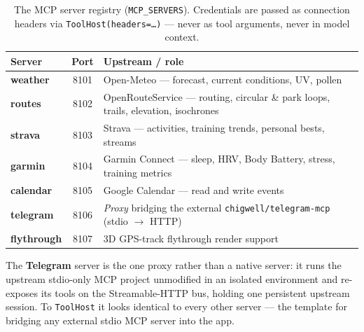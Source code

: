 \documentclass[11pt,a4paper]{article}
\newcommand{\code}[1]{{\small\texttt{#1}}}
\begin{document}
\begin{table}[ht]\centering\footnotesize
\renewcommand{\arraystretch}{1.25}
\begin{tabular}{@{}>{\bfseries}l c l@{}}
\toprule
\normalfont\textbf{Server} & \textbf{Port} & \textbf{Upstream / role} \\
\midrule
weather    & 8101 & Open-Meteo --- forecast, current conditions, UV, pollen \\
routes     & 8102 & OpenRouteService --- routing, circular \& park loops, trails, elevation, isochrones \\
strava     & 8103 & Strava --- activities, training trends, personal bests, streams \\
garmin     & 8104 & Garmin Connect --- sleep, HRV, Body Battery, stress, training metrics \\
calendar   & 8105 & Google Calendar --- read and write events \\
telegram   & 8106 & \emph{Proxy} bridging the external \code{chigwell/telegram-mcp} (stdio $\rightarrow$ HTTP) \\
flythrough & 8107 & 3D GPS-track flythrough render support \\
\bottomrule
\end{tabular}
\caption{The MCP server registry (\code{MCP\_SERVERS}). Credentials are passed as connection
headers via \code{ToolHost(headers=\ldots)} --- never as tool arguments, never in model context.}
\end{table}

The \textbf{Telegram} server is the one proxy rather than a native server: it runs the
upstream stdio-only MCP project unmodified in an isolated environment and re-exposes its
tools on the Streamable-HTTP bus, holding one persistent upstream session. To \code{ToolHost}
it looks identical to every other server --- the template for bridging any external stdio MCP
server into the app.

\end{document}
